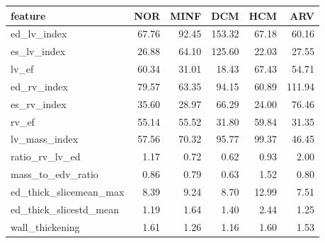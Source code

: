 \begin{tabular}{lrrrrr}
\toprule
feature & NOR & MINF & DCM & HCM & ARV \\
\midrule
ed\_lv\_index & 67.76 & 92.45 & 153.32 & 67.18 & 60.16 \\
es\_lv\_index & 26.88 & 64.10 & 125.60 & 22.03 & 27.55 \\
lv\_ef & 60.34 & 31.01 & 18.43 & 67.43 & 54.71 \\
ed\_rv\_index & 79.57 & 63.35 & 94.15 & 60.89 & 111.94 \\
es\_rv\_index & 35.60 & 28.97 & 66.29 & 24.00 & 76.46 \\
rv\_ef & 55.14 & 55.52 & 31.80 & 59.84 & 31.35 \\
lv\_mass\_index & 57.56 & 70.32 & 95.77 & 99.37 & 46.45 \\
ratio\_rv\_lv\_ed & 1.17 & 0.72 & 0.62 & 0.93 & 2.00 \\
mass\_to\_edv\_ratio & 0.86 & 0.79 & 0.63 & 1.52 & 0.80 \\
ed\_thick\_slicemean\_max & 8.39 & 9.24 & 8.70 & 12.99 & 7.51 \\
ed\_thick\_slicestd\_mean & 1.19 & 1.64 & 1.40 & 2.44 & 1.25 \\
wall\_thickening & 1.61 & 1.26 & 1.16 & 1.60 & 1.53 \\
\bottomrule
\end{tabular}
